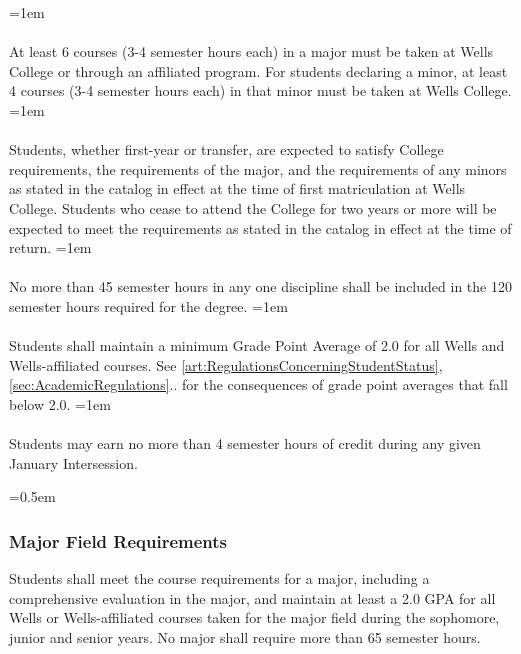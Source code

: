 \documentclass{manual}
\let\oldsubsubsection\subsubsection
\renewcommand\subsubsection{\leftskip=0.5em\oldsubsubsection}
\let\oldparagraph\paragraph
\renewcommand\paragraph{\leftskip=1em\oldparagraph}
\begin{document}
\paragraph{} At least 6 courses (3-4 semester hours each) in a major must be taken at Wells College or through an affiliated program. For students declaring a minor, at least 4 courses (3-4 semester hours each) in that minor must be taken at Wells College.
\paragraph{} Students, whether first-year or transfer, are expected to satisfy College requirements, the requirements of the major, and the requirements  of any minors as stated in the catalog in effect at the time of first matriculation at Wells College. Students who cease to attend the College for two years or more will be expected to meet the requirements as stated in the catalog in effect at the time of return.
\paragraph{} No more than 45 semester hours in any one discipline shall be included   in the 120 semester hours required for the degree.
\paragraph{} Students shall maintain a minimum Grade Point Average of 2.0 for all Wells and Wells-affiliated courses. See \cref{art:RegulationsConcerningStudentStatus}, \cref{sec:AcademicRegulations}.. for the consequences of grade point averages that fall below 2.0.
\paragraph{} Students may earn no more than 4 semester hours of credit during any given January  Intersession.




\subsubsection{Major Field Requirements}

Students  shall meet the course requirements for a major, including a comprehensive evaluation in the major, and maintain at least a 2.0 GPA for all Wells or Wells-affiliated courses taken for the major field during the sophomore, junior and senior years. No major shall require more than 65 semester hours.
\end{document}
